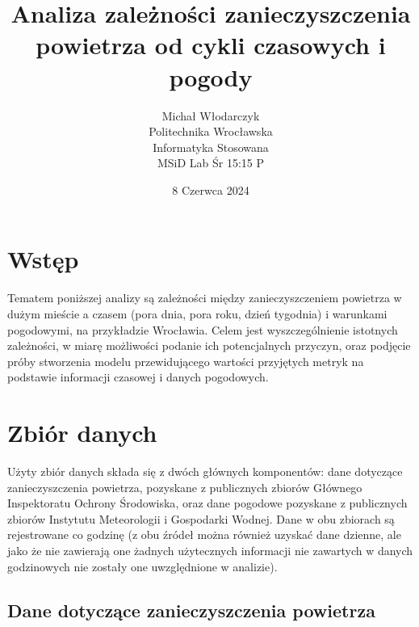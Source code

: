\documentclass[18pt, letterpaper]{article}
\title{Analiza zależności zanieczyszczenia powietrza od cykli czasowych i pogody}
\author{Michał Włodarczyk \\ Politechnika Wrocławska \\ Informatyka Stosowana \\ MSiD Lab Śr 15:15 P \\ }
\date{8 Czerwca 2024}
\begin{document}
\begin{titlepage}
\maketitle
\vspace{10em}
\tableofcontents
\end{titlepage}



\section{Wstęp}

 Tematem poniższej analizy są zależności między zanieczyszczeniem powietrza w dużym mieście a czasem (pora dnia, pora roku, dzień tygodnia) i warunkami pogodowymi, na przykładzie Wrocławia. Celem jest wyszczególnienie istotnych zależności, w miarę możliwości podanie ich potencjalnych przyczyn, oraz podjęcie próby stworzenia modelu przewidującego wartości przyjętych metryk na podstawie informacji czasowej i danych pogodowych.




 
\section{Zbiór danych}

Użyty zbiór danych składa się z dwóch głównych komponentów: dane dotyczące zanieczyszczenia powietrza, pozyskane z publicznych zbiorów Głównego Inspektoratu Ochrony Środowiska\cite{pollution_source}, oraz dane pogodowe pozyskane z publicznych zbiorów Instytutu Meteorologii i Gospodarki Wodnej\cite{weather_source}. Dane w obu zbiorach są rejestrowane co godzinę (z obu źródeł można również uzyskać dane dzienne, ale jako że nie zawierają one żadnych użytecznych informacji nie zawartych w danych godzinowych nie zostały one uwzględnione w analizie).

\subsection{Dane dotyczące zanieczyszczenia powietrza}
\end{document}
